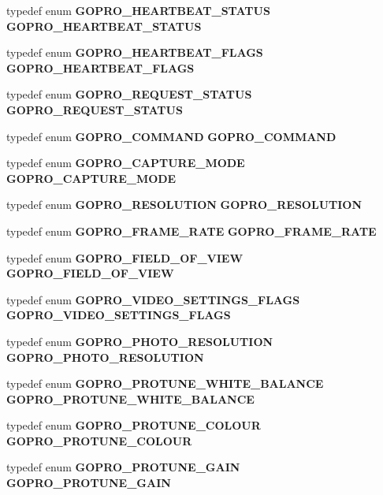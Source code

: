 \begin{DoxyCompactItemize}
\item 
typedef enum \textbf{ G\+O\+P\+R\+O\+\_\+\+H\+E\+A\+R\+T\+B\+E\+A\+T\+\_\+\+S\+T\+A\+T\+US} \textbf{ G\+O\+P\+R\+O\+\_\+\+H\+E\+A\+R\+T\+B\+E\+A\+T\+\_\+\+S\+T\+A\+T\+US}
\item 
typedef enum \textbf{ G\+O\+P\+R\+O\+\_\+\+H\+E\+A\+R\+T\+B\+E\+A\+T\+\_\+\+F\+L\+A\+GS} \textbf{ G\+O\+P\+R\+O\+\_\+\+H\+E\+A\+R\+T\+B\+E\+A\+T\+\_\+\+F\+L\+A\+GS}
\item 
typedef enum \textbf{ G\+O\+P\+R\+O\+\_\+\+R\+E\+Q\+U\+E\+S\+T\+\_\+\+S\+T\+A\+T\+US} \textbf{ G\+O\+P\+R\+O\+\_\+\+R\+E\+Q\+U\+E\+S\+T\+\_\+\+S\+T\+A\+T\+US}
\item 
typedef enum \textbf{ G\+O\+P\+R\+O\+\_\+\+C\+O\+M\+M\+A\+ND} \textbf{ G\+O\+P\+R\+O\+\_\+\+C\+O\+M\+M\+A\+ND}
\item 
typedef enum \textbf{ G\+O\+P\+R\+O\+\_\+\+C\+A\+P\+T\+U\+R\+E\+\_\+\+M\+O\+DE} \textbf{ G\+O\+P\+R\+O\+\_\+\+C\+A\+P\+T\+U\+R\+E\+\_\+\+M\+O\+DE}
\item 
typedef enum \textbf{ G\+O\+P\+R\+O\+\_\+\+R\+E\+S\+O\+L\+U\+T\+I\+ON} \textbf{ G\+O\+P\+R\+O\+\_\+\+R\+E\+S\+O\+L\+U\+T\+I\+ON}
\item 
typedef enum \textbf{ G\+O\+P\+R\+O\+\_\+\+F\+R\+A\+M\+E\+\_\+\+R\+A\+TE} \textbf{ G\+O\+P\+R\+O\+\_\+\+F\+R\+A\+M\+E\+\_\+\+R\+A\+TE}
\item 
typedef enum \textbf{ G\+O\+P\+R\+O\+\_\+\+F\+I\+E\+L\+D\+\_\+\+O\+F\+\_\+\+V\+I\+EW} \textbf{ G\+O\+P\+R\+O\+\_\+\+F\+I\+E\+L\+D\+\_\+\+O\+F\+\_\+\+V\+I\+EW}
\item 
typedef enum \textbf{ G\+O\+P\+R\+O\+\_\+\+V\+I\+D\+E\+O\+\_\+\+S\+E\+T\+T\+I\+N\+G\+S\+\_\+\+F\+L\+A\+GS} \textbf{ G\+O\+P\+R\+O\+\_\+\+V\+I\+D\+E\+O\+\_\+\+S\+E\+T\+T\+I\+N\+G\+S\+\_\+\+F\+L\+A\+GS}
\item 
typedef enum \textbf{ G\+O\+P\+R\+O\+\_\+\+P\+H\+O\+T\+O\+\_\+\+R\+E\+S\+O\+L\+U\+T\+I\+ON} \textbf{ G\+O\+P\+R\+O\+\_\+\+P\+H\+O\+T\+O\+\_\+\+R\+E\+S\+O\+L\+U\+T\+I\+ON}
\item 
typedef enum \textbf{ G\+O\+P\+R\+O\+\_\+\+P\+R\+O\+T\+U\+N\+E\+\_\+\+W\+H\+I\+T\+E\+\_\+\+B\+A\+L\+A\+N\+CE} \textbf{ G\+O\+P\+R\+O\+\_\+\+P\+R\+O\+T\+U\+N\+E\+\_\+\+W\+H\+I\+T\+E\+\_\+\+B\+A\+L\+A\+N\+CE}
\item 
typedef enum \textbf{ G\+O\+P\+R\+O\+\_\+\+P\+R\+O\+T\+U\+N\+E\+\_\+\+C\+O\+L\+O\+UR} \textbf{ G\+O\+P\+R\+O\+\_\+\+P\+R\+O\+T\+U\+N\+E\+\_\+\+C\+O\+L\+O\+UR}
\item 
typedef enum \textbf{ G\+O\+P\+R\+O\+\_\+\+P\+R\+O\+T\+U\+N\+E\+\_\+\+G\+A\+IN} \textbf{ G\+O\+P\+R\+O\+\_\+\+P\+R\+O\+T\+U\+N\+E\+\_\+\+G\+A\+IN}

\end{DoxyCompactItemize}
